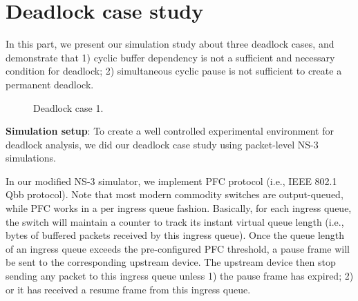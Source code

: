 \section{Deadlock case study}\label{sec:casestudy}

In this part, we present our simulation study about three deadlock cases, and demonstrate that 1) cyclic buffer dependency is not a sufficient and necessary condition for deadlock; 2) simultaneous cyclic pause is not sufficient to create a permanent deadlock.

\begin{figure}[t]
\centering



\caption{Deadlock case 1.}\label{fig:case1}

\end{figure}

 \textbf{Simulation setup}: To create a well controlled experimental environment for deadlock analysis, we did our deadlock case study using packet-level NS-3 simulations. 
 
 In our modified NS-3 simulator, we implement PFC protocol (i.e., IEEE 802.1 Qbb protocol). Note that most modern commodity switches are output-queued, while PFC works in a per ingress queue fashion. Basically, for each ingress queue, the switch will maintain a counter to track its instant virtual queue length (i.e., bytes of buffered packets received by this ingress queue). Once the queue length of an ingress queue exceeds the pre-configured PFC threshold, a pause frame will be sent to the corresponding upstream device. The upstream device then stop sending any packet to this ingress queue unless 1) the pause frame has expired; 2) or it has received a resume frame from this ingress queue.
 
